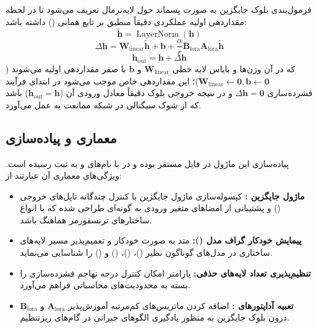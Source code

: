 فرمول‌بندی بلوک جایگزین به صورت پسماند حول لایه‌نرمال تعریف می‌شود تا در لحظه مقداردهی اولیه عملکردی دقیقاً منطبق بر تابع همانی () داشته باشد:
\begin{equation}
\tilde{\mathbf{h}} = \operatorname{LayerNorm}(\mathbf{h})
\end{equation}
\begin{equation}
\Delta \mathbf{h} = \mathbf{W}_{\text{linear}} \tilde{\mathbf{h}} + \mathbf{b} + \frac{\alpha}{r} \mathbf{B}_{\text{lora}} \mathbf{A}_{\text{lora}} \tilde{\mathbf{h}}
\end{equation}
\begin{equation}
\mathbf{h}_{\text{out}} = \mathbf{h} + \Delta \mathbf{h}
\end{equation}
که در آن وزن‌ها و بایاس لایه خطی $\mathbf{W}_{\text{linear}}$ و $\mathbf{b}$ با صفر مقداردهی اولیه می‌شوند ($\mathbf{W}_{\text{linear}} \leftarrow \mathbf{0}, \mathbf{b} \leftarrow \mathbf{0}$)؛ این مقداردهی خاص موجب می‌شود در ابتدای فرآیند فشرده‌سازی $\Delta \mathbf{h} = \mathbf{0}$ و در نتیجه خروجی بلوک دقیقاً معادل ورودی آن ($\mathbf{h}_{\text{out}} = \mathbf{h}$) باشد که از شوک سیگنالی در شبکه ممانعت به عمل می‌آورد.

\subsection{معماری و پیاده‌سازی}
پیاده‌سازی این ماژول در فایل  مستقر بوده و در  با نام‌های  و  به ثبت رسیده است. ویژگی‌های معماری آن عبارتند از:
\begin{itemize}
    \item \textbf{ماژول جایگزین :} کپسوله‌سازی ماژول جایگزین با کنترل چندگانه تاپل‌های خروجی () و پشتیبانی از امضاهای متغیر ورودی به گونه‌ای طراحی شده که با انواع ساختارهای ترنسفورمر هماهنگ باشد.
    \item \textbf{پیمایش خودکار گراف مدل ():} متد  به صورت خودکار و تعمیم‌پذیر مسیر لایه‌های ساختاری در مدل‌های گوناگون نظیر  ()،  ()،  () و  () را شناسایی می‌نماید.
    \item \textbf{تنظیم‌پذیری تعداد لایه‌های حذفی:} پارامتر  امکان کنترل درجه تهاجم فشرده‌سازی را بسته به محدودیت‌های محاسباتی فراهم می‌آورد.
    \item \textbf{تعبیه آداپتورهای :} اضافه کردن ماتریس‌های کم‌مرتبه آموزش‌پذیر $\mathbf{A}_{\text{lora}}$ و $\mathbf{B}_{\text{lora}}$ درون بلوک جایگزین به منظور یادگیری الگوهای جبرانی در گام‌های ریزتنظیم.
\end{itemize}

